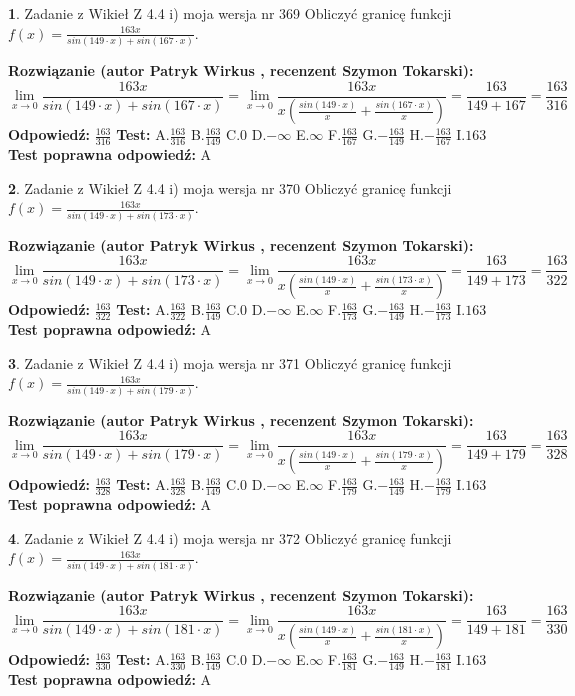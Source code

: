 \documentclass[12pt, a4paper]{article}
\theoremstyle{definition} %
\newtheorem{zad}{}
\newcommand{\zadStart}[1]{\begin{zad}#1\newline}
\newcommand{\zadStop}{\end{zad}}
\newcommand{\rozwStart}[2]{\noindent \textbf{Rozwiązanie (autor #1 , recenzent #2): }\newline}
\newcommand{\rozwStop}{\newline}
\newcommand{\odpStart}{\noindent \textbf{Odpowiedź:}\newline}
\newcommand{\odpStop}{\newline}
\newcommand{\testStart}{\noindent \textbf{Test:}\newline}
\newcommand{\testStop}{\newline}
\newcommand{\kluczStart}{\noindent \textbf{Test poprawna odpowiedź:}\newline}
\newcommand{\kluczStop}{\newline}
\begin{document}
\zadStart{Zadanie z Wikieł Z 4.4 i) moja wersja nr 369}
Obliczyć granicę funkcji $f(x)=\frac{163x}{sin(149\cdot x) +sin(167\cdot x)}$.
\zadStop
\rozwStart{Patryk Wirkus}{Szymon Tokarski}
$$\lim\limits_{x\to 0}\frac{163x}{sin(149\cdot x) +sin(167\cdot x)}=\lim\limits_{x\to 0}\frac{163x}{x(\frac{sin(149\cdot x)}{x}+\frac{sin(167\cdot x)}{x})}=\frac{163}{149+167} = \frac{163}{316}$$
\rozwStop
\odpStart
$\frac{163}{316}$
\odpStop
\testStart
A.$\frac{163}{316}$
B.$\frac{163}{149}$
C.$0$
D.$-\infty$
E.$\infty$
F.$\frac{163}{167}$
G.$-\frac{163}{149}$
H.$-\frac{163}{167}$
I.$163$
\testStop
\kluczStart
A
\kluczStop



\zadStart{Zadanie z Wikieł Z 4.4 i) moja wersja nr 370}
Obliczyć granicę funkcji $f(x)=\frac{163x}{sin(149\cdot x) +sin(173\cdot x)}$.
\zadStop
\rozwStart{Patryk Wirkus}{Szymon Tokarski}
$$\lim\limits_{x\to 0}\frac{163x}{sin(149\cdot x) +sin(173\cdot x)}=\lim\limits_{x\to 0}\frac{163x}{x(\frac{sin(149\cdot x)}{x}+\frac{sin(173\cdot x)}{x})}=\frac{163}{149+173} = \frac{163}{322}$$
\rozwStop
\odpStart
$\frac{163}{322}$
\odpStop
\testStart
A.$\frac{163}{322}$
B.$\frac{163}{149}$
C.$0$
D.$-\infty$
E.$\infty$
F.$\frac{163}{173}$
G.$-\frac{163}{149}$
H.$-\frac{163}{173}$
I.$163$
\testStop
\kluczStart
A
\kluczStop



\zadStart{Zadanie z Wikieł Z 4.4 i) moja wersja nr 371}
Obliczyć granicę funkcji $f(x)=\frac{163x}{sin(149\cdot x) +sin(179\cdot x)}$.
\zadStop
\rozwStart{Patryk Wirkus}{Szymon Tokarski}
$$\lim\limits_{x\to 0}\frac{163x}{sin(149\cdot x) +sin(179\cdot x)}=\lim\limits_{x\to 0}\frac{163x}{x(\frac{sin(149\cdot x)}{x}+\frac{sin(179\cdot x)}{x})}=\frac{163}{149+179} = \frac{163}{328}$$
\rozwStop
\odpStart
$\frac{163}{328}$
\odpStop
\testStart
A.$\frac{163}{328}$
B.$\frac{163}{149}$
C.$0$
D.$-\infty$
E.$\infty$
F.$\frac{163}{179}$
G.$-\frac{163}{149}$
H.$-\frac{163}{179}$
I.$163$
\testStop
\kluczStart
A
\kluczStop



\zadStart{Zadanie z Wikieł Z 4.4 i) moja wersja nr 372}
Obliczyć granicę funkcji $f(x)=\frac{163x}{sin(149\cdot x) +sin(181\cdot x)}$.
\zadStop
\rozwStart{Patryk Wirkus}{Szymon Tokarski}
$$\lim\limits_{x\to 0}\frac{163x}{sin(149\cdot x) +sin(181\cdot x)}=\lim\limits_{x\to 0}\frac{163x}{x(\frac{sin(149\cdot x)}{x}+\frac{sin(181\cdot x)}{x})}=\frac{163}{149+181} = \frac{163}{330}$$
\rozwStop
\odpStart
$\frac{163}{330}$
\odpStop
\testStart
A.$\frac{163}{330}$
B.$\frac{163}{149}$
C.$0$
D.$-\infty$
E.$\infty$
F.$\frac{163}{181}$
G.$-\frac{163}{149}$
H.$-\frac{163}{181}$
I.$163$
\testStop
\kluczStart
A
\kluczStop
\end{document}
